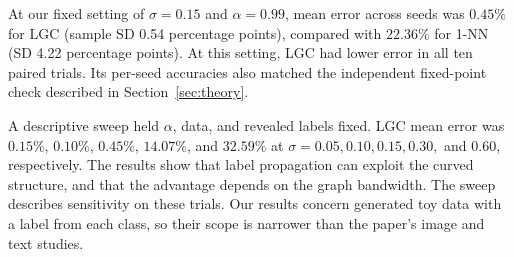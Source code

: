 At our fixed setting of $\sigma=0.15$ and $\alpha=0.99$, mean error across
seeds was $0.45\%$ for LGC (sample SD 0.54 percentage points), compared with
$22.36\%$ for 1-NN (SD 4.22 percentage points). At this setting, LGC had lower error in all ten paired trials. Its per-seed accuracies also matched the independent fixed-point
check described in Section~\ref{sec:theory}.

A descriptive sweep held $\alpha$, data, and revealed labels fixed. LGC mean
error was $0.15\%$, $0.10\%$, $0.45\%$, $14.07\%$, and $32.59\%$ at
$\sigma=0.05, 0.10, 0.15, 0.30,$ and $0.60$, respectively. The results show
that label propagation can exploit the curved structure, and that the
advantage depends on the graph bandwidth. The sweep describes sensitivity
on these trials. Our results concern generated toy data with a label from
each class, so their scope is narrower than the paper's image and text studies.
